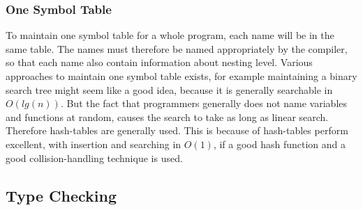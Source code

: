 \subsubsection*{One Symbol Table}
To maintain one symbol table for a whole program, each name will be in the same table. The names must therefore be named appropriately by the compiler, so that each name also contain information about nesting level. Various approaches to maintain one symbol table exists, for example maintaining a binary search tree might seem like a good idea, because it is generally searchable in $O(lg(n))$. But the fact that programmers generally does not name variables and functions at random, causes the search to take as long as linear search. Therefore hash-tables are generally used. This is because of hash-tables perform excellent, with insertion and searching in $O(1)$, if a good hash function and a good collision-handling technique is used.
\subsection{Type Checking}